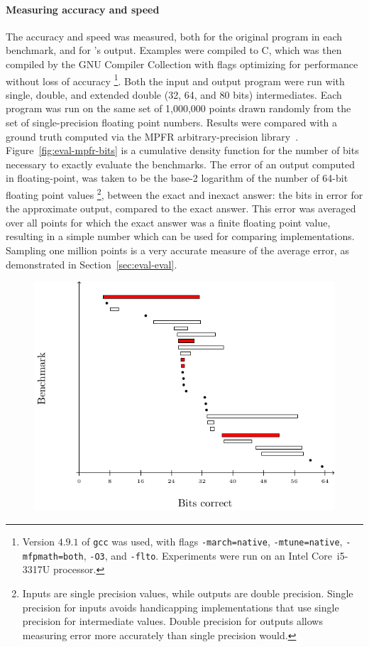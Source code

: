 \documentclass[paper.tex]{subfiles}
\begin{document}
\paragraph{Measuring accuracy and speed}
The accuracy and speed was measured,
  both for the original program in each benchmark,
  and for \casio's output.
Examples were compiled to C,
  which was then compiled by the GNU Compiler Collection
  with flags optimizing for performance without loss of accuracy%
  \footnote{Version $4.9.1$ of \texttt{gcc} was used, with flags
    \texttt{-march=native}, \texttt{-mtune=native},
    \texttt{-mfpmath=both}, \texttt{-O3}, and \texttt{-flto}.
    Experiments were run on an Intel Core~i5-3317U processor.}.
Both the input and output program were run
  with single, double, and extended double (32, 64, and 80 bits)
  intermediates.
Each program was run on the same set of 1,000,000 points
  drawn randomly from the set of single-precision floating point numbers.
Results were compared with a ground truth computed via
  the MPFR arbitrary-precision library~\cite{acm07-mpfr}.
Figure~\ref{fig:eval-mpfr-bits} is a cumulative density function
  for the number of bits necessary to exactly evaluate the benchmarks.
The error of an output computed in floating-point,
  was taken to be the base-2 logarithm of the number
  of 64-bit floating point values%
  \footnote{Inputs are single precision values,
    while outputs are double precision.
    Single precision for inputs avoids handicapping implementations
    that use single precision for intermediate values.
    Double precision for outputs allows measuring error
    more accurately than single precision would.},
  between the exact and inexact answer:
  the bits in error for the approximate output, compared to the exact answer.
This error was averaged over all points for which the exact answer
  was a finite floating point value,
  resulting in a simple number which can be used for comparing implementations.
Sampling one million points
  is a very accurate measure of the average error,
  as demonstrated in Section~\ref{sec:eval-eval}.

\begin{figure}
\label{fig:eval-rect-f}
\includegraphics[width=0.9\columnwidth]{fig/eval-rect-f.pdf}
\caption{}
\end{figure}
\end{document}
